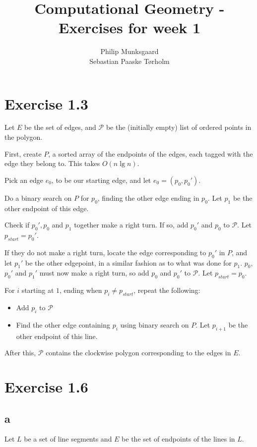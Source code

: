 \documentclass[11pt,a4paper]{article}
\title{Computational Geometry - Exercises for week 1}
\author{Philip Munksgaard\\Sebastian Paaske Tørholm}
\begin{document}
\maketitle

\section{Exercise 1.3}
Let $E$ be the set of edges, and $\mathcal{P}$ be the (initially empty) list of
ordered points in the polygon.

First, create $P$, a sorted array of the endpoints of the edges, each tagged
with the edge they belong to. This takes $O(n \lg n)$.

Pick an edge $e_0$, to be our starting edge, and let $e_0 = (p_0, p_0')$.

Do a binary search on $P$ for $p_0$, finding the other edge ending in $p_0$. Let
$p_1$ be the other endpoint of this edge.

Check if $p_0', p_0$ and $p_1$ together make a right turn. If so, add $p_0'$ and
$p_0$ to $\mathcal{P}$. Let $p_{start} = p_0'$.

If they do not make a right turn, locate the edge corresponding to $p_0'$ in
$P$, and let $p_1'$ be the other edgepoint, in a similar fashion as to what
was done for $p_1$. $p_0$, $p_0'$ and $p_1'$ must now make a right turn, so add
$p_0$ and $p_0'$ to $\mathcal{P}$. Let $p_{start} = p_0$.

For $i$ starting at $1$, ending when $p_i \neq p_{start}$, repeat the following: 
\begin{itemize}
    \item Add $p_i$ to $\mathcal{P}$
    \item Find the other edge containing $p_i$ using binary search on $P$. Let $p_{i+1}$
          be the other endpoint of this line.
\end{itemize}

After this, $\mathcal{P}$ contains the clockwise polygon corresponding to the
edges in $E$.

\section{Exercise 1.6}

\subsection{a}
Let $L$ be a set of line segments and $E$ be the set of endpoints of the lines in $L$.
\end{document}
